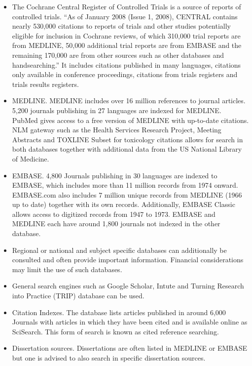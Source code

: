 \begin{itemize}
\item The Cochrane Central Register of Controlled Trials is a source of reports of controlled trials. ``As of January 2008 (Issue 1, 2008), CENTRAL contains nearly 530,000 citations to reports of trials and other studies potentially eligible for inclusion in Cochrane reviews, of which 310,000 trial reports are from MEDLINE, 50,000 additional trial reports are from EMBASE and the remaining 170,000 are from other sources such as other databases and handsearching.'' It includes citations published in many languages, citations only available in conference proceedings, citations from trials registers and trials results registers.
\item MEDLINE. MEDLINE includes over 16 million references to journal articles. 5,200 journals publishing in 27 languages are indexed for MEDLINE. PubMed gives access to a free version of MEDLINE with up-to-date citations. NLM gateway such as the Health Services Research Project, Meeting Abstracts and TOXLINE Subset for toxicology citations allows for search in both databases together with additional data from the US National Library of Medicine.
\item EMBASE. 4,800 Journals publishing in 30 languages are indexed to EMBASE, which includes more than 11 million records from 1974 onward. EMBASE.com also includes 7 million unique records from MEDLINE (1966 up to date) together with its own records. Additionally, EMBASE Classic allows access to digitized records from 1947 to 1973. EMBASE and MEDLINE each have around 1,800 journals not indexed in the other database.
\item Regional or national and subject specific databases can additionally be consulted and often provide important information. Financial considerations may limit the use of such databases.
\item General search engines such as Google Scholar, Intute and Turning Research into Practice (TRIP) database can be used.
\item Citation Indexes. The database lists articles published in around 6,000 Journals with articles in which they have been cited and is available online as SciSearch. This form of search is known as cited reference searching.
\item Dissertation sources. Dissertations are often listed in MEDLINE or EMBASE but one is advised to also search in specific dissertation sources.

\end{itemize}
